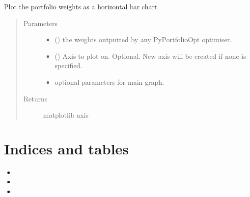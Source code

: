 \documentclass[letterpaper,10pt,english]{sphinxmanual}
\begin{document}
\begin{fulllineitems}
\label{\detokenize{dalio.util:dalio.util.plot_weights}}
Plot the portfolio weights as a horizontal bar chart
\begin{quote}\begin{description}
\item[{Parameters}] \leavevmode\begin{itemize}
\item {} 
 () \textendash{} the weights outputted by any PyPortfolioOpt
optimiser.

\item {} 
 (\sphinxstyleliteralemphasis{\sphinxupquote{, }}) \textendash{} Axis to plot on. Optional. New axis will
be created if none is specified.

\item {} 
 \textendash{} optional parameters for main graph.

\end{itemize}

\item[{Returns}] \leavevmode
matplotlib axis

\end{description}\end{quote}

\end{fulllineitems}



\chapter{Indices and tables}
\label{\detokenize{index:indices-and-tables}}\begin{itemize}
\item {} 

\item {} 

\item {} 

\end{itemize}
\end{document}

